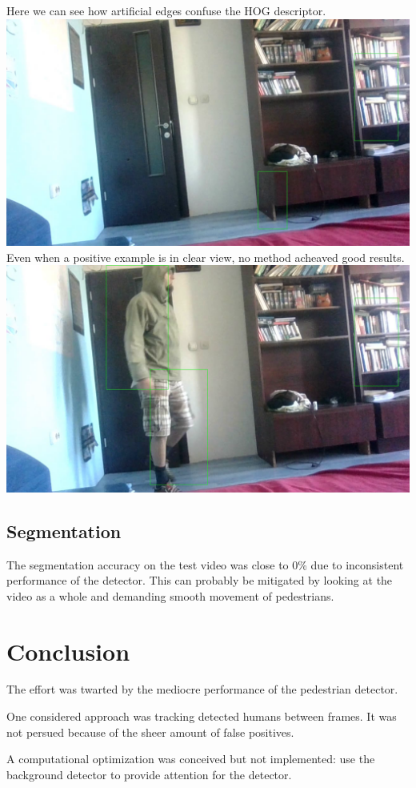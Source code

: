 \documentclass{article}
\begin{document}
Here we can see how artificial edges confuse the HOG descriptor.
\\
\includegraphics[height=0.5\textheight]{../img/false-positives}
\\
Even when a positive example is in clear view, no method acheaved good results.
\\
\includegraphics[height=0.5\textheight]{../img/pedestrian}
\\

\subsection{Segmentation}
The segmentation accuracy on the test video was close to 0\% due to inconsistent performance of the detector.
This can probably be mitigated by looking at the video as a whole and demanding smooth movement of pedestrians.


\section{Conclusion}
The effort was twarted by the mediocre performance of the pedestrian detector.

One considered approach was tracking detected humans between frames.
It was not persued because of the sheer amount of false positives.

A computational optimization was conceived but not implemented: use the background detector to provide attention for the detector.


\printbibliography
\end{document}
